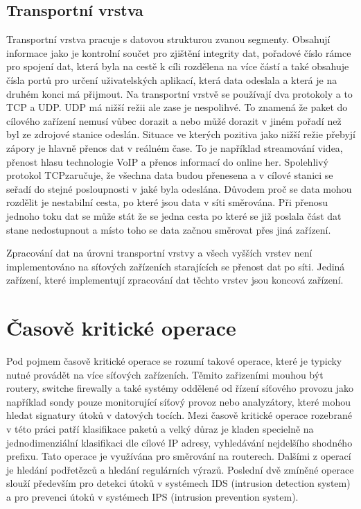 \subsection{Transportní vrstva}\label{layers:transport}
Transportní vrstva pracuje s datovou strukturou zvanou segmenty.
Obsahují informace jako je kontrolní součet pro zjištění integrity dat,
pořadové číslo rámce pro spojení dat, která byla na cestě k cíli rozdělena na více částí a také obsahuje čísla portů
pro určení uživatelských aplikací, která data odeslala a která je na druhém konci má přijmout.
Na transportní vrstvě se používají dva protokoly a to TCP a UDP. UDP má nižší režii ale zase je nespolihvé.
To znamená že paket do cílového zařízení nemusí vůbec dorazit a nebo můžé dorazit v jiném pořadí než byl ze
zdrojové stanice odeslán. Situace ve kterých pozitiva jako nižší režie přebyjí zápory je hlavně přenos dat v
reálném čase. To je například streamování videa, přenost hlasu technologie VoIP a přenos informací do online her.
Spolehlivý protokol TCPzaručuje, že všechna data budou přenesena a v cílové stanici se seřadí do
stejné posloupnosti v jaké byla odeslána. Důvodem proč se data mohou rozdělit je nestabilní cesta,
po které jsou data v síti směrována. Při přenosu jednoho toku dat se může stát že se jedna cesta po které se
již poslala část dat stane nedostupnout a místo toho se data začnou směrovat přes jiná zařízení.

Zpracování dat na úrovni transportní vrstvy a všech vyšších vrstev není implementováno na síťových
zařízeních starajících se přenost dat po síti. Jediná zařízení, které implementují zpracování
dat těchto vrstev jsou koncová zařízení.

\section{Časově kritické operace}
Pod pojmem časově kritické operace se rozumí takové operace, které je typicky nutné provádět
na více síťových zařízeních. Těmito zařizeními mouhou být routery, switche firewally a také systémy
oddělené od řízení síťového provozu jako například sondy pouze monitorující síťový provoz
nebo analyzátory, které mohou hledat signatury útoků v datových tocích.
Mezi časově kritické operace rozebrané v této práci patří klasifikace paketů a velký důraz je kladen specielně na
jednodimenziální klasifikaci dle cílové IP adresy, vyhledávání nejdelšího shodného prefixu.
Tato operace je využívána pro směrování na routerech.
Dalšími z operací je hledání podřetězců a hledání regulárních výrazů. Poslední dvě zmíněné operace
slouží především pro detekci útoků v systémech IDS (intrusion detection system) a pro prevenci útoků v systémech
IPS (intrusion prevention system).

